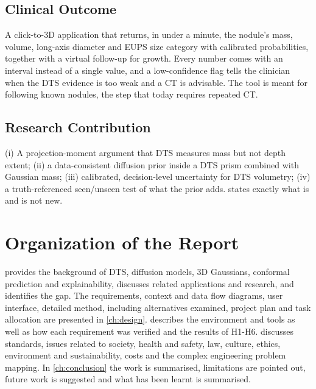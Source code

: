 \subsection{Clinical Outcome}
 A click-to-3D application that returns, in under a minute, the nodule's mass, volume, long-axis diameter and EUPS size category with calibrated probabilities, together with a virtual follow-up for growth. Every number comes with an interval instead of a single value, and a low-confidence flag tells the clinician when the DTS evidence is too weak and a CT is advisable. The tool is meant for following known nodules, the step that today requires repeated CT.

\subsection{Research Contribution}
 (i) A projection-moment argument that DTS measures mass but not depth extent; (ii) a data-consistent diffusion prior inside a DTS prism combined with Gaussian mass; (iii) calibrated, decision-level uncertainty for DTS volumetry; (iv) a truth-referenced seen/unseen test of what the prior adds.  states exactly what is and is not new.

\section{Organization of the Report}

 provides the background of DTS, diffusion models, 3D Gaussians, conformal prediction and explainability, discusses related applications and research, and identifies the gap. The requirements, context and data flow diagrams, user interface, detailed method, including alternatives examined, project plan and task allocation are presented in \cref{ch:design}.  describes the environment and tools as well as how each requirement was verified and the results of H1-H6.  discusses standards, issues related to society, health and safety, law, culture, ethics, environment and sustainability, costs and the complex engineering problem mapping. In \cref{ch:conclusion} the work is summarised, limitations are pointed out, future work is suggested and what has been learnt is summarised.
